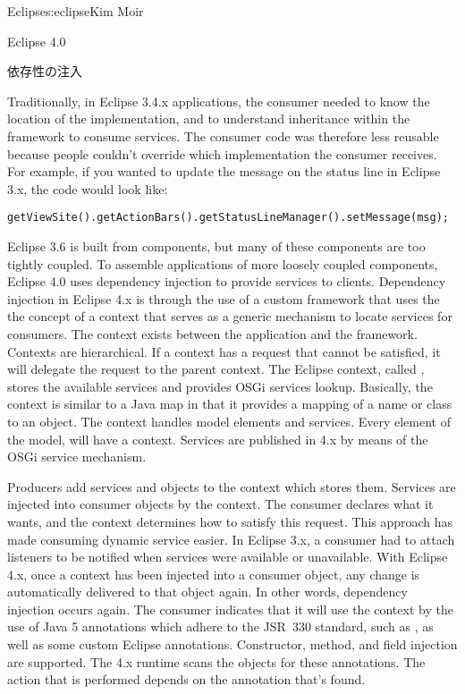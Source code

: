 \begin{aosachapter}{Eclipse}{s:eclipse}{Kim Moir}
\begin{aosasect1}{Eclipse 4.0}
\begin{aosasect2}{依存性の注入}
\pagebreak

Traditionally, in Eclipse 3.4.x applications, the consumer needed
to know the location of the implementation, and to
understand inheritance within the framework to
consume services. The consumer code was therefore less reusable
because people couldn't override which implementation the consumer
receives. For example, if you wanted to update the message on the
status line in Eclipse 3.x, the code would look like:

\begin{verbatim}
getViewSite().getActionBars().getStatusLineManager().setMessage(msg);
\end{verbatim}

Eclipse 3.6 is built from components, but many of these components are
too tightly coupled. To assemble applications of more loosely coupled
components, Eclipse 4.0 uses dependency injection to provide services
to clients. Dependency injection in Eclipse 4.x is through the use of
a custom framework that uses the the concept of a context that serves
as a generic mechanism to locate services for consumers.  The context
exists between the application and the framework. Contexts are
hierarchical. If a context has a request that cannot be satisfied,
it will delegate the request to the parent context. The Eclipse
context, called , stores the available services and
provides OSGi services lookup.  Basically, the context is similar to a
Java map in that it provides a mapping of a name or class to an
object.  The context handles model elements and services.  Every
element of the model, will have a context. Services are published in
4.x by means of the OSGi service mechanism.


Producers add services and objects to the context which stores them.
Services are injected into consumer objects by the context. The
consumer declares what it wants, and the context determines how to
satisfy this request. This approach has made consuming dynamic service
easier. In Eclipse 3.x, a consumer had to attach listeners to be
notified when services were available or unavailable. With Eclipse
4.x, once a context has been injected into a consumer object, any
change is automatically delivered to that object again. In other
words, dependency injection occurs again. The consumer indicates that
it will use the context by the use of Java 5 annotations which adhere
to the JSR~330 standard, such as , as well as some
custom Eclipse annotations. Constructor, method, and field injection
are supported.  The 4.x runtime scans the objects for these
annotations. The action that is performed depends on the annotation
that's found.


\end{aosasect2}
\end{aosasect1}
\end{aosachapter}
